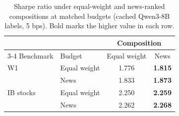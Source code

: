 \begin{table}[!t]
\centering
\caption{Sharpe ratio under equal-weight and news-ranked compositions at matched budgets (cached Qwen3-8B labels, 5 bps). Bold marks the higher value in each row.}
\label{tab:matched-budget}
{\small
\setlength{\tabcolsep}{5pt}
\begin{tabular*}{\textwidth}{@{\extracolsep{\fill}}llcc}
\toprule
 & & \multicolumn{2}{c}{Composition} \\
\cmidrule(l){3-4}
Benchmark & Budget & Equal weight & News \\
\midrule
W1 & Equal weight & 1.776 & \textbf{1.815} \\
   & News         & 1.833 & \textbf{1.873} \\
\addlinespace
IB stocks & Equal weight & 2.250 & \textbf{2.259} \\
          & News         & 2.262 & \textbf{2.268} \\
\bottomrule
\end{tabular*}}
\end{table}


